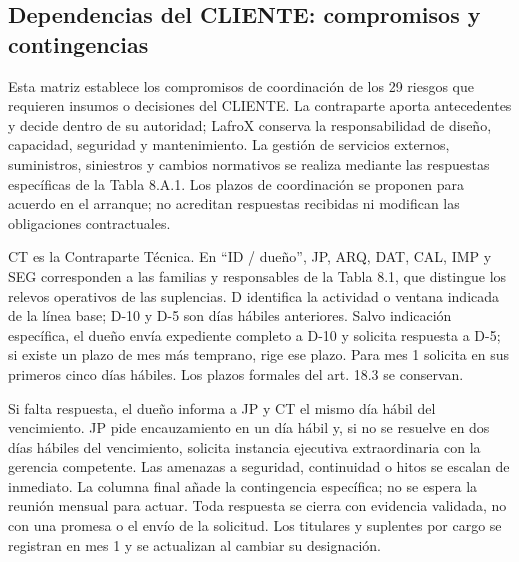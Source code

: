 \documentclass[carta,firma,sinnotas]{lafrox}
\begin{document}
\subsection*{Dependencias del CLIENTE: compromisos y contingencias}

Esta matriz establece los compromisos de coordinación de los 29 riesgos que requieren insumos o decisiones del CLIENTE. La contraparte aporta antecedentes y decide dentro de su autoridad; LafroX conserva la responsabilidad de diseño, capacidad, seguridad y mantenimiento. La gestión de servicios externos, suministros, siniestros y cambios normativos se realiza mediante las respuestas específicas de la Tabla 8.A.1. Los plazos de coordinación se proponen para acuerdo en el arranque; no acreditan respuestas recibidas ni modifican las obligaciones contractuales.

CT es la Contraparte Técnica. En ``ID / dueño'', JP, ARQ, DAT, CAL, IMP y SEG corresponden a las familias y responsables de la Tabla 8.1, que distingue los relevos operativos de las suplencias. D identifica la actividad o ventana indicada de la línea base; D-10 y D-5 son días hábiles anteriores. Salvo indicación específica, el dueño envía expediente completo a D-10 y solicita respuesta a D-5; si existe un plazo de mes más temprano, rige ese plazo. Para mes 1 solicita en sus primeros cinco días hábiles. Los plazos formales del art. 18.3 se conservan.

Si falta respuesta, el dueño informa a JP y CT el mismo día hábil del vencimiento. JP pide encauzamiento en un día hábil y, si no se resuelve en dos días hábiles del vencimiento, solicita instancia ejecutiva extraordinaria con la gerencia competente. Las amenazas a seguridad, continuidad o hitos se escalan de inmediato. La columna final añade la contingencia específica; no se espera la reunión mensual para actuar. Toda respuesta se cierra con evidencia validada, no con una promesa o el envío de la solicitud. Los titulares y suplentes por cargo se registran en mes 1 y se actualizan al cambiar su designación.
\end{document}
